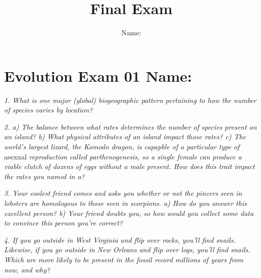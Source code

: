 \documentclass[11pt]{article}
\title{Final Exam}
\author{Name:}
\begin{document}
\section*{Evolution Exam 01 \hspace{5cm}  Name:}

\emph{1. What is one major (global) biogeographic pattern pertaining to how the number of species varies by location?}
\vspace{6cm}

\emph{2. a) The balance between what rates determines the number of species present on an island? b) What physical attributes of an island impact those rates? c) The world's largest lizard, the Komodo dragon, is capapble of a particular type of} asexual \emph{reproduction called parthenogenesis, so a single female can produce a viable clutch of dozens of eggs without a male present. How does this trait impact the rates you named in a?}
\vspace{6cm}

\emph{3. Your coolest friend comes and asks you whether or not the pincers seen in lobsters are homologous to those seen in scorpions. a) How do you answer this excellent person? b) Your friend doubts you, so how would you collect some data to convince this person you're correct?}
\vspace{6cm}

\emph{4. If you go outside in West Virginia and flip over rocks, you'll find snails. Likewise, if you go outside in New Orleans and flip over logs, you'll find snails. Which are more likely to be present in the fossil record millions of years from now, and why?}
\vspace{6cm}
\end{document}

